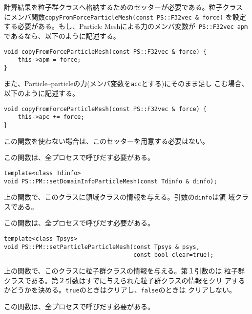 計算結果を粒子群クラスへ格納するためのセッターが必要である。粒子クラス
にメンバ関数{\tt copyFromForceParticleMesh(const PS::F32vec \& force)}
を設定する必要がある。もし、Particle Meshによる力のメンバ変数が{\tt
  PS::F32vec apm}であるなら、以下のように記述する。
\begin{screen}
\begin{verbatim}
void copyFromForceParticleMesh(const PS::F32vec & force) {
    this->apm = force;
}
\end{verbatim}
\end{screen}
また、Particle--particleの力(メンバ変数を{\tt acc}とする)にそのまま足し
こむ場合、以下のように記述する。
\begin{screen}
\begin{verbatim}
void copyFromForceParticleMesh(const PS::F32vec & force) {
    this->apc += force;
}
\end{verbatim}
\end{screen}
この関数を使わない場合は、このセッターを用意する必要はない。

この関数は、全プロセスで呼びだす必要がある。


\begin{screen}
\begin{verbatim}
template<class Tdinfo>
void PS::PM::setDomainInfoParticleMesh(const Tdinfo & dinfo);
\end{verbatim}
\end{screen}

上の関数で、このクラスに領域クラスの情報を与える。引数の{\tt dinfo}は領
域クラスである。

この関数は、全プロセスで呼びだす必要がある。


\begin{screen}
\begin{verbatim}
template<class Tpsys>
void PS::PM::setParticleParticleMesh(const Tpsys & psys,
                                     const bool clear=true);
\end{verbatim}
\end{screen}

上の関数で、このクラスに粒子群クラスの情報を与える。第１引数の{\tt }は
粒子群クラスである。第２引数はすでに与えられた粒子群クラスの情報をクリ
アするかどうかを決める。{\tt true}のときはクリアし、{\tt false}のときは
クリアしない。

この関数は、全プロセスで呼びだす必要がある。

